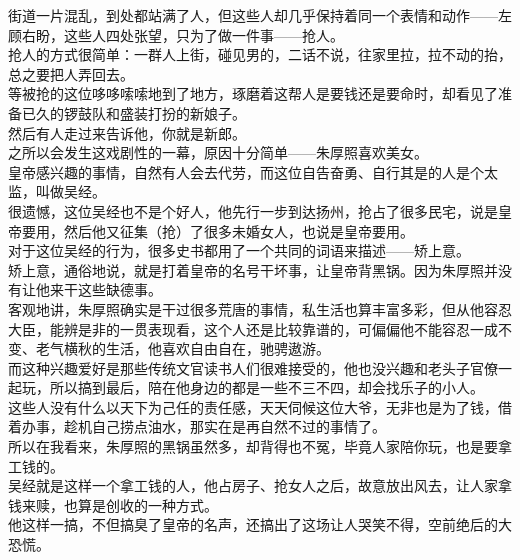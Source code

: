 \begin{multicols}{\theparacolNo}
街道一片混乱，到处都站满了人，但这些人却几乎保持着同一个表情和动作——左顾右盼，这些人四处张望，只为了做一件事——抢人。\\

抢人的方式很简单：一群人上街，碰见男的，二话不说，往家里拉，拉不动的抬，总之要把人弄回去。\\

等被抢的这位哆哆嗦嗦地到了地方，琢磨着这帮人是要钱还是要命时，却看见了准备已久的锣鼓队和盛装打扮的新娘子。\\

然后有人走过来告诉他，你就是新郎。\\

之所以会发生这戏剧性的一幕，原因十分简单——朱厚照喜欢美女。\\

皇帝感兴趣的事情，自然有人会去代劳，而这位自告奋勇、自行其是的人是个太监，叫做吴经。\\

很遗憾，这位吴经也不是个好人，他先行一步到达扬州，抢占了很多民宅，说是皇帝要用，然后他又征集（抢）了很多未婚女人，也说是皇帝要用。\\

对于这位吴经的行为，很多史书都用了一个共同的词语来描述——矫上意。\\

矫上意，通俗地说，就是打着皇帝的名号干坏事，让皇帝背黑锅。因为朱厚照并没有让他来干这些缺德事。\\

客观地讲，朱厚照确实是干过很多荒唐的事情，私生活也算丰富多彩，但从他容忍大臣，能辨是非的一贯表现看，这个人还是比较靠谱的，可偏偏他不能容忍一成不变、老气横秋的生活，他喜欢自由自在，驰骋遨游。\\

而这种兴趣爱好是那些传统文官读书人们很难接受的，他也没兴趣和老头子官僚一起玩，所以搞到最后，陪在他身边的都是一些不三不四，却会找乐子的小人。\\

这些人没有什么以天下为己任的责任感，天天伺候这位大爷，无非也是为了钱，借着办事，趁机自己捞点油水，那实在是再自然不过的事情了。\\

所以在我看来，朱厚照的黑锅虽然多，却背得也不冤，毕竟人家陪你玩，也是要拿工钱的。\\

吴经就是这样一个拿工钱的人，他占房子、抢女人之后，故意放出风去，让人家拿钱来赎，也算是创收的一种方式。\\

他这样一搞，不但搞臭了皇帝的名声，还搞出了这场让人哭笑不得，空前绝后的大恐慌。\\


\end{multicols}
